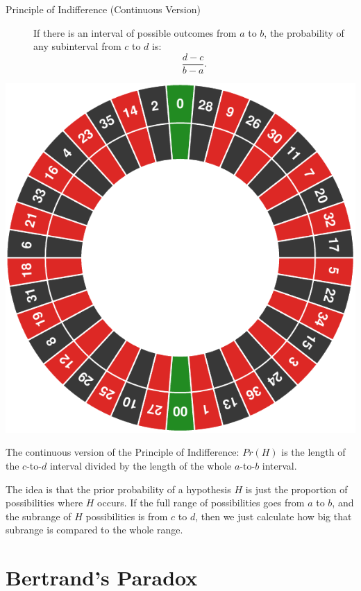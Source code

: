 \documentclass[justified]{tufte-book}
\theoremstyle{definition}
\theoremstyle{definition}
\theoremstyle{definition}
\theoremstyle{remark}
\begin{document}
\begin{description}
\item[Principle of Indifference (Continuous Version)]
If there is an interval of possible outcomes from \(a\) to \(b\), the
probability of any subinterval from \(c\) to \(d\) is:
\[\frac{d-c}{b-a}.\]
\end{description}

\begin{marginfigure}
\includegraphics{_main_files/figure-latex/unnamed-chunk-134-1} \caption[The continuous version of the Principle of Indifference]{The continuous version of the Principle of Indifference: $Pr(H)$ is the length of the $c$-to-$d$ interval divided by the length of the whole $a$-to-$b$ interval.}\label{fig:unnamed-chunk-134}
\end{marginfigure}

The idea is that the prior probability of a hypothesis \(H\) is just the
proportion of possibilities where \(H\) occurs. If the full range of
possibilities goes from \(a\) to \(b\), and the subrange of \(H\)
possibilities is from \(c\) to \(d\), then we just calculate how big
that subrange is compared to the whole range.

\hypertarget{bertrands-paradox}{%
\section{Bertrand's Paradox}\label{bertrands-paradox}}
\end{document}
